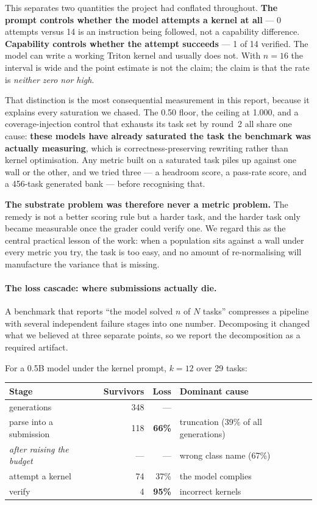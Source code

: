 \noindent This separates two quantities the project had conflated throughout. \textbf{The
prompt controls whether the model attempts a kernel at all} --- 0 attempts versus 14 is an
instruction being followed, not a capability difference. \textbf{Capability controls whether
the attempt succeeds} --- 1 of 14 verified. The model can write a working Triton kernel and
usually does not. With $n{=}16$ the interval is wide and the point estimate is not the claim;
the claim is that the rate is \emph{neither zero nor high}.

That distinction is the most consequential measurement in this report, because it explains every
saturation we chased. The 0.50 floor, the ceiling at 1.000, and a coverage-injection control
that exhausts its task set by round~2 all share one cause: \textbf{these models have already
saturated the task the benchmark was actually measuring}, which is correctness-preserving
rewriting rather than kernel optimisation. Any metric built on a saturated task piles up against
one wall or the other, and we tried three --- a headroom score, a pass-rate score, and a
456-task generated bank --- before recognising that.

\textbf{The substrate problem was therefore never a metric problem.} The remedy is not a better
scoring rule but a harder task, and the harder task only became measurable once the grader could
verify one. We regard this as the central practical lesson of the work: when a population sits
against a wall under every metric you try, the task is too easy, and no amount of re-normalising
will manufacture the variance that is missing.

\paragraph{The loss cascade: where submissions actually die.}
A benchmark that reports ``the model solved $n$ of $N$ tasks'' compresses a pipeline with
several independent failure stages into one number. Decomposing it changed what we believed at
three separate points, so we report the decomposition as a required artifact.

For a 0.5B model under the kernel prompt, $k{=}12$ over 29 tasks:

\begin{center}\small
\begin{tabular}{@{}lrrl@{}}
\toprule
\textbf{Stage} & \textbf{Survivors} & \textbf{Loss} & \textbf{Dominant cause} \\
\midrule
generations & 348 & --- & \\
parse into a submission & 118 & \textbf{66\%} & truncation (39\% of all generations) \\
\quad \emph{after raising the budget} & --- & --- & wrong class name (67\%) \\
attempt a kernel & 74 & 37\% & the model complies \\
verify & 4 & \textbf{95\%} & incorrect kernels \\
\bottomrule
\end{tabular}
\end{center}

